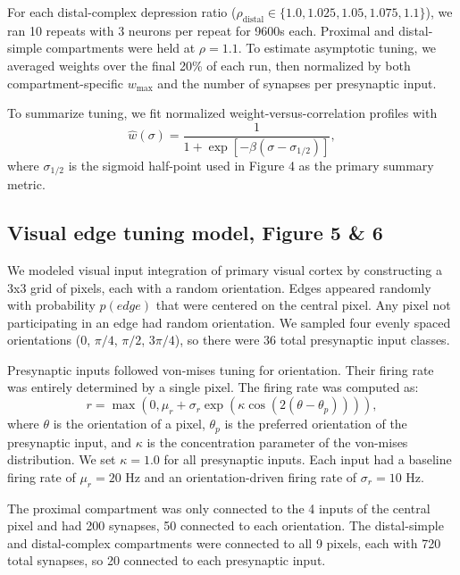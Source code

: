 \documentclass[twocolumn]{theme/bioRxiv}
\begin{document}
For each distal-complex depression ratio ($\rho_{\mathrm{distal}}\in\{1.0,1.025,1.05,1.075,1.1\}$), we ran 10 repeats with 3 neurons per repeat for 9600s each. Proximal and distal-simple compartments were held at $\rho=1.1$. To estimate asymptotic tuning, we averaged weights over the final 20\% of each run, then normalized by both compartment-specific $w_{\max}$ and the number of synapses per presynaptic input.

To summarize tuning, we fit normalized weight-versus-correlation profiles with
\begin{equation*}
\hat w(\sigma)=\frac{1}{1+\exp\!\left[-\beta(\sigma-\sigma_{1/2})\right]},
\end{equation*}
where $\sigma_{1/2}$ is the sigmoid half-point used in Figure 4 as the primary summary metric.

\subsection*{Visual edge tuning model, Figure 5 \& 6}
We modeled visual input integration of primary visual cortex by constructing a 3x3 grid of pixels, each with a random orientation. Edges appeared randomly with probability $p(edge)$ that were centered on the central pixel. Any pixel not participating in an edge had random orientation. We sampled four evenly spaced orientations ($0$, $\pi/4$, $\pi/2$, $3\pi/4$), so there were 36 total presynaptic input classes. 

Presynaptic inputs followed von-mises tuning for orientation. Their firing rate was entirely determined by a single pixel. The firing rate was computed as: 
\begin{equation*}
r = \max\!\left(0,\mu_r+\sigma_r \exp\!\left(\kappa \cos(2(\theta - \theta_p))\right)\right),
\end{equation*}
where $\theta$ is the orientation of a pixel, $\theta_p$ is the preferred orientation of the presynaptic input, and $\kappa$ is the concentration parameter of the von-mises distribution. We set $\kappa=1.0$ for all presynaptic inputs. Each input had a baseline firing rate of $\mu_r=20$ Hz and an orientation-driven firing rate of $\sigma_r=10$ Hz.

The proximal compartment was only connected to the 4 inputs of the central pixel and had 200 synapses, 50 connected to each orientation. The distal-simple and distal-complex compartments were connected to all 9 pixels, each with 720 total synapses, so 20 connected to each presynaptic input.
\end{document}
